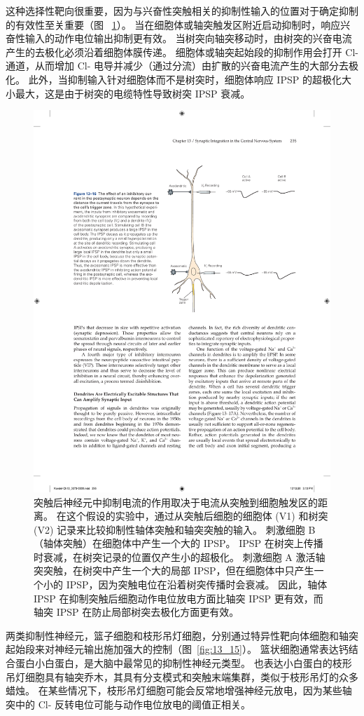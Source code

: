 这种选择性靶向很重要，因为与兴奋性突触相关的抑制性输入的位置对于确定抑制的有效性至关重要（图 ~\ref{fig:13_16}）。
当在细胞体或轴突触发区附近启动抑制时，响应兴奋性输入的动作电位输出抑制更有效。
当树突向轴突移动时，由树突的兴奋电流产生的去极化必须沿着细胞体膜传递。
细胞体或轴突起始段的抑制作用会打开 Cl- 通道，从而增加 Cl- 电导并减少（通过分流）由扩散的兴奋电流产生的大部分去极化。
此外，当抑制输入针对细胞体而不是树突时，细胞体响应 IPSP 的超极化大小最大，这是由于树突的电缆特性导致树突 IPSP 衰减。


\begin{figure}[htbp]
	\centering
	\includegraphics[width=0.6\linewidth]{chap13/fig_13_16}
	\caption{突触后神经元中抑制电流的作用取决于电流从突触到细胞触发区的距离。 在这个假设的实验中，通过从突触后细胞的细胞体 (V1) 和树突 (V2) 记录来比较抑制性轴体突触和轴突突触的输入。 刺激细胞 B（轴体突触）在细胞体中产生一个大的 IPSP。 IPSP 在树突上传播时衰减，在树突记录的位置仅产生小的超极化。 刺激细胞 A 激活轴突突触，在树突中产生一个大的局部 IPSP，但在细胞体中只产生一个小的 IPSP，因为突触电位在沿着树突传播时会衰减。 因此，轴体 IPSP 在抑制突触后细胞动作电位放电方面比轴突 IPSP 更有效，而轴突 IPSP 在防止局部树突去极化方面更有效。}
	\label{fig:13_16}
\end{figure}


两类抑制性神经元，篮子细胞和枝形吊灯细胞，分别通过特异性靶向体细胞和轴突起始段来对神经元输出施加强大的控制（图~\ref{fig:13_15}）。
篮状细胞通常表达钙结合蛋白小白蛋白，是大脑中最常见的抑制性神经元类型。
也表达小白蛋白的枝形吊灯细胞具有轴突乔木，其具有分支模式和突触末端集群，类似于枝形吊灯的众多蜡烛。
在某些情况下，枝形吊灯细胞可能会反常地增强神经元放电，因为某些轴突中的 Cl- 反转电位可能与动作电位放电的阈值正相关。


